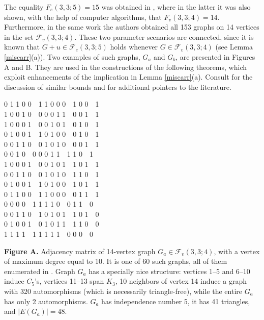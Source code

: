 \medskip
The equality $F_e(3,3;5)=15$ was obtained
in \cite{Nenov81,PRU}, where in the latter
it was also shown, with the help of computer algorithms,
that $F_v(3,3;4)=14$. Furthermore, in the same work
the authors obtained all 153 graphs on 14 vertices
in the set $\mathcal{F}_v(3,3;4)$. These two parameter
scenarios are connected, since it is known that
$G+u \in \mathcal{F}_e(3,3;5)$ holds whenever
$G \in \mathcal{F}_v(3,3;4)$ (see Lemma \ref{miscarr}(a)).
Two examples of such graphs, $G_a$ and $G_b$,
are presented in Figures A and B.
They are used in the constructions of the following
theorems, which exploit enhancements of
the implication in Lemma \ref{miscarr}(a).
Consult \cite{XLR1}
for the discussion of similar bounds and for
additional pointers to the literature.

\bigskip
\begin{center}
{\small
0 1 1 0 0\ \ 1 1 0 0 0\ \ 1 0 0\ \ 1\\
1 0 0 1 0\ \ 0 0 0 1 1\ \ 0 0 1\ \ 1\\
1 0 0 0 1\ \ 0 0 1 0 1\ \ 0 1 0\ \ 1\\
0 1 0 0 1\ \ 1 0 1 0 0\ \ 0 1 0\ \ 1\\
0 0 1 1 0\ \ 0 1 0 1 0\ \ 0 0 1\ \ 1\\

 0 0 1 0\ \ 0 0 0 1 1\ \ 1 1 0\ \ 1\\
1 0 0 0 1\ \ 0 0 1 0 1\ \ 1 0 1\ \ 1\\
0 0 1 1 0\ \ 0 1 0 1 0\ \ 1 1 0\ \ 1\\
0 1 0 0 1\ \ 1 0 1 0 0\ \ 1 0 1\ \ 1\\
0 1 1 0 0\ \ 1 1 0 0 0\ \ 0 1 1\ \ 1\\

 0 0 0 0\ \ 1 1 1 1 0\ \ 0 1 1\ \ 0\\
0 0 1 1 0\ \ 1 0 1 0 1\ \ 1 0 1\ \ 0\\
0 1 0 0 1\ \ 0 1 0 1 1\ \ 1 1 0\ \ 0\\

 1 1 1 1\ \ 1 1 1 1 1\ \ 0 0 0\ \ 0\\
}
\end{center}

\medskip
\begingroup\leftskip=15pt\rightskip=15pt
\noindent
{\small
{\bf Figure A.} Adjacency matrix of 14-vertex graph
$G_a \in \mathcal{F}_v(3,3;4)$, with a vertex of
maximum degree equal to 10. It is one of 60 such
graphs, all of them enumerated in \cite{PRU}.
Graph $G_a$ has a specially nice structure:
vertices 1--5 and 6--10 induce $C_5$'s,
vertices 11--13 span $K_3$, 10 neighbors of
vertex 14 induce a graph with 320 automorphisms
(which is necessarily triangle-free),
while the entire $G_a$ has only 2 automorphisms.
$G_a$ has independence number 5, it has 41 triangles,
and $|E(G_a)|=48$.
}
\par\endgroup

